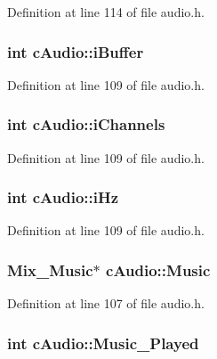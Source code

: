Definition at line 114 of file audio.\-h.

\hypertarget{classc_audio_a9bd6aa3fef6284334ee9b726c0cf1a1b}{
\subsubsection[{i\-Buffer}]{\setlength{\rightskip}{0pt plus 5cm}int c\-Audio\-::i\-Buffer}}\label{classc_audio_a9bd6aa3fef6284334ee9b726c0cf1a1b}


Definition at line 109 of file audio.\-h.

\hypertarget{classc_audio_a3f946cdea09fd857bee05b8a7326a8d7}{
\subsubsection[{i\-Channels}]{\setlength{\rightskip}{0pt plus 5cm}int c\-Audio\-::i\-Channels}}\label{classc_audio_a3f946cdea09fd857bee05b8a7326a8d7}


Definition at line 109 of file audio.\-h.

\hypertarget{classc_audio_a33a95a4128134a55b2a68d25d60ae314}{
\subsubsection[{i\-Hz}]{\setlength{\rightskip}{0pt plus 5cm}int c\-Audio\-::i\-Hz}}\label{classc_audio_a33a95a4128134a55b2a68d25d60ae314}


Definition at line 109 of file audio.\-h.

\hypertarget{classc_audio_a1079677c50a60ef5e6a3c09cd2af8d91}{
\subsubsection[{Music}]{\setlength{\rightskip}{0pt plus 5cm}Mix\-\_\-\-Music$\ast$ c\-Audio\-::\-Music}}\label{classc_audio_a1079677c50a60ef5e6a3c09cd2af8d91}


Definition at line 107 of file audio.\-h.

\hypertarget{classc_audio_a9f20d77fb103d6e1f87819ad406a5f0d}{
\subsubsection[{Music\-\_\-\-Played}]{\setlength{\rightskip}{0pt plus 5cm}int c\-Audio\-::\-Music\-\_\-\-Played}}\label{classc_audio_a9f20d77fb103d6e1f87819ad406a5f0d}


